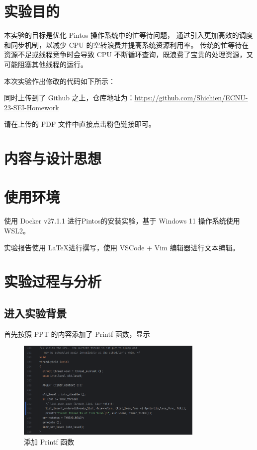 \tableofcontents %

\section{实验目的}

本实验的目标是优化 Pintos 操作系统中的忙等待问题，
通过引入更加高效的调度和同步机制，以减少 CPU 的空转浪费并提高系统资源利用率。
传统的忙等待在资源不足或线程竞争时会导致 CPU 不断循环查询，既浪费了宝贵的处理资源，又可能阻塞其他线程的运行。

本次实验作出修改的代码如下所示：

同时上传到了 Github 之上，仓库地址为：\href{https://github.com/Shichien/ECNU-23-SEI-Homework/tree/main/%E6%93%8D%E4%BD%9C%E7%B3%BB%E7%BB%9F/%E5%AE%9E%E8%B7%B5%E8%AF%BE%E4%BD%9C%E4%B8%9A/Lec%202/lst2}{\underline{https://github.com/Shichien/ECNU-23-SEI-Homework}}

请在上传的 PDF 文件中直接点击粉色链接即可。

\section{内容与设计思想}



\section{使用环境}

使用 Docker v27.1.1 进行Pintos的安装实验，基于 Windows 11 操作系统使用 WSL2。

实验报告使用 \LaTeX 进行撰写，使用 VSCode + Vim 编辑器进行文本编辑。

\section{实验过程与分析}

\subsection{进入实验背景}

首先按照 PPT 的内容添加了 Printf 函数，显示
\begin{figure} [H]
    \centering
    \includegraphics[width=0.8\textwidth]{img4/printf.png}
    \caption{添加 Printf 函数}
    \label{fig:pintos}
\end{figure}

